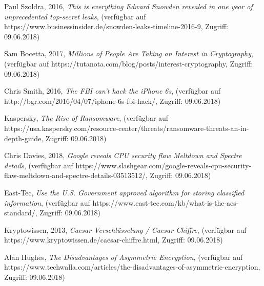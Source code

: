 \documentclass[conference,10pt,a4paper,twocolumn]{IEEEtran}
\begin{document}
%
%
%
\begin{thebibliography}{1}

Paul Szoldra, 2016, \emph{This is everything Edward Snowden revealed in one year of unprecedented top-secret leaks}, (verfügbar auf https://www.businessinsider.de/snowden-leaks-timeline-2016-9, Zugriff: 09.06.2018)

Sam Bocetta, 2017, \emph{Millions of People Are Taking an Interest in Cryptography}, (verfügbar auf https://tutanota.com/blog/posts/interest-cryptography, Zugriff: 09.06.2018)

Chris Smith, 2016, \emph{The FBI can’t hack the iPhone 6s}, (verfügbar auf http://bgr.com/2016/04/07/iphone-6s-fbi-hack/, Zugriff: 09.06.2018)

Kaspersky, \emph{The Rise of Ransomware}, (verfügbar auf https://usa.kaspersky.com/resource-center/threats/ransomware-threats-an-in-depth-guide, Zugriff: 09.06.2018)

Chris Davies, 2018, \emph{Google reveals CPU security flaw Meltdown and Spectre details}, (verfügbar auf https://www.slashgear.com/google-reveals-cpu-security-flaw-meltdown-and-spectre-details-03513512/, Zugriff: 09.06.2018)

East-Tec, \emph{Use the U.S. Government approved algorithm for storing classified information}, (verfügbar auf https://www.east-tec.com/kb/what-is-the-aes-standard/, Zugriff: 09.06.2018)

Kryptowissen, 2013, \emph{Caesar Verschlüsselung / Caesar Chiffre}, (verfügbar auf https://www.kryptowissen.de/caesar-chiffre.html, Zugriff: 09.06.2018)

Alan Hughes, \emph{The Disadvantages of Asymmetric Encryption}, (verfügbar auf https://www.techwalla.com/articles/the-disadvantages-of-asymmetric-encryption, Zugriff: 09.06.2018)


\end{thebibliography}
\end{document}
